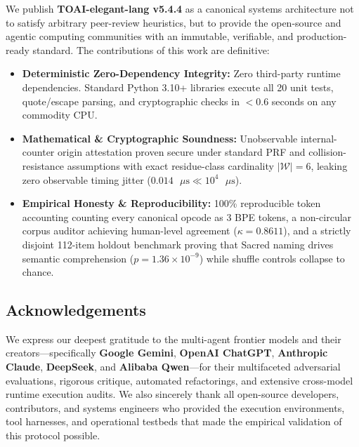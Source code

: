 \documentclass[9pt,a4paper]{extarticle}
\begin{document}
We publish \textbf{TOAI-elegant-lang v5.4.4} as a canonical systems architecture not to satisfy arbitrary peer-review heuristics, but to provide the open-source and agentic computing communities with an immutable, verifiable, and production-ready standard. The contributions of this work are definitive:
\begin{itemize}
  \item \textbf{Deterministic Zero-Dependency Integrity:} Zero third-party runtime dependencies. Standard Python 3.10+ libraries execute all 20 unit tests, quote/escape parsing, and cryptographic checks in $<0.6$ seconds on any commodity CPU.
  \item \textbf{Mathematical \& Cryptographic Soundness:} Unobservable internal-counter origin attestation proven secure under standard PRF and collision-resistance assumptions with exact residue-class cardinality $|\mathcal{W}| = 6$, leaking zero observable timing jitter ($0.014\text{ }\mu\text{s} \ll 10^4\text{ }\mu\text{s}$).
  \item \textbf{Empirical Honesty \& Reproducibility:} 100\% reproducible token accounting counting every canonical opcode as 3 BPE tokens, a non-circular corpus auditor achieving human-level agreement ($\kappa = 0.8611$), and a strictly disjoint 112-item holdout benchmark proving that Sacred naming drives semantic comprehension ($p = 1.36 \times 10^{-9}$) while shuffle controls collapse to chance.
\end{itemize}

\subsection*{Acknowledgements}
{\footnotesize
We express our deepest gratitude to the multi-agent frontier models and their creators---specifically \textbf{Google Gemini}, \textbf{OpenAI ChatGPT}, \textbf{Anthropic Claude}, \textbf{DeepSeek}, and \textbf{Alibaba Qwen}---for their multifaceted adversarial evaluations, rigorous critique, automated refactorings, and extensive cross-model runtime execution audits. We also sincerely thank all open-source developers, contributors, and systems engineers who provided the execution environments, tool harnesses, and operational testbeds that made the empirical validation of this protocol possible.
}
\end{document}
